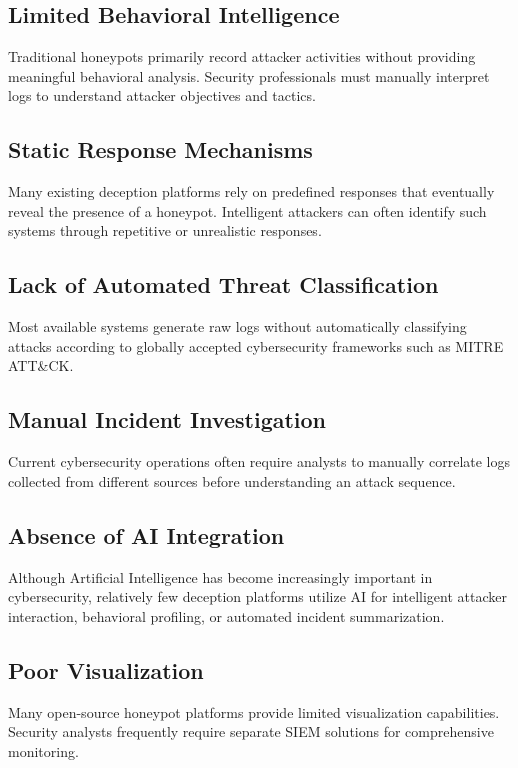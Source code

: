 \documentclass[12pt,a4paper]{report}
\begin{document}
\subsection{Limited Behavioral Intelligence}
Traditional honeypots primarily record attacker activities without providing meaningful behavioral analysis. Security professionals must manually interpret logs to understand attacker objectives and tactics.

\subsection{Static Response Mechanisms}
Many existing deception platforms rely on predefined responses that eventually reveal the presence of a honeypot. Intelligent attackers can often identify such systems through repetitive or unrealistic responses.

\subsection{Lack of Automated Threat Classification}
Most available systems generate raw logs without automatically classifying attacks according to globally accepted cybersecurity frameworks such as MITRE ATT\&CK.

\subsection{Manual Incident Investigation}
Current cybersecurity operations often require analysts to manually correlate logs collected from different sources before understanding an attack sequence.

\subsection{Absence of AI Integration}
Although Artificial Intelligence has become increasingly important in cybersecurity, relatively few deception platforms utilize AI for intelligent attacker interaction, behavioral profiling, or automated incident summarization.

\subsection{Poor Visualization}
Many open-source honeypot platforms provide limited visualization capabilities. Security analysts frequently require separate SIEM solutions for comprehensive monitoring.

\end{document}
